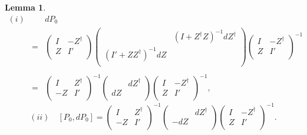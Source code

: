\documentclass[makeidx,12pt,openany]{report}
\newtheorem{lem}[df]{Lemma}
\begin{document}
\begin{lem}\label{lem:partialP}
\begin{eqnarray}
(i) && dP_0 \nonumber\\ &=&
         \left(
           \begin{array}{cc}
               I & -Z^{\dag}  \\
               Z & I' \\
            \end{array}
         \right)
\left(
   \begin{array}{rl}
      & (I+Z^{\dag}Z)^{-1}dZ^{\dag} \\
     (I'+Z Z^{\dag})^{-1}dZ &  \\
   \end{array}
\right)
         \left(
           \begin{array}{cc}
               I & -Z^{\dag}  \\
               Z & I' \\
            \end{array}
         \right)^{-1} \nonumber\\
     &&\label{eqn:trace}\\
     &=& \left(
           \begin{array}{cc}
               I & Z^{\dag}  \\
              -Z & I' \\
            \end{array}
         \right)^{-1}  
         \left(
           \begin{array}{cc}
                 & dZ^{\dag}  \\
              dZ &    \\
            \end{array}
         \right) 
         \left(
           \begin{array}{cc}
               I & -Z^{\dag}  \\
               Z & I' \\
            \end{array}
         \right)^{-1},
 \label{eqn:n1-11}
\end{eqnarray}
\begin{equation}
(ii) \quad [P_0,dP_0]=
         \left(
           \begin{array}{cc}
               I & Z^{\dag}  \\
              -Z & I' \\
            \end{array}
         \right)^{-1}  
         \left(
           \begin{array}{cc}
                 & dZ^{\dag}  \\
             -dZ &    \\
            \end{array}
         \right) 
         \left(
           \begin{array}{cc}
               I & -Z^{\dag}  \\
               Z & I' \\
            \end{array}
         \right)^{-1}.
        \label{eqn:PdP}
\end{equation}
\end{lem}
\end{document}
